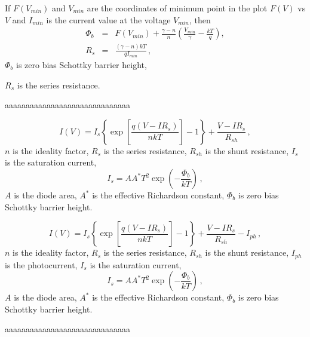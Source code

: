 \documentclass[14pt]{article}
\numberwithin{equation}{part}
\begin{document}
If $F(V_{min})$ and $V_{min}$ are the coordinates of minimum point in the plot $F(V)$ vs $V$ and
$I_{min}$ is the current value at the voltage $V_{min}$, then
\begin{eqnarray*}
\Phi_b&=&F(V_{min})+\frac{\gamma-n}{n}\left(\frac{V_{min}}{\gamma}-\frac{kT}{q}\right),
\\
R_s&=&\frac{(\gamma-n)kT}{qI_{min}}\,,
\end{eqnarray*}
$\Phi_b$ is zero bias Schottky barrier height,

\noindent
$R_s$ is the series resistance.


\vspace{5mm}
aaaaaaaaaaaaaaaaaaaaaaaaaaaaaa
\vspace{5mm}

\begin{equation*}
I(V)=I_s\left\{\exp \left[\frac{q(V-IR_s)}{nkT}\right]-1\right\}+\frac{V-IR_s}{R_{sh}}\,,
\end{equation*}
$n$ is the ideality factor,
$R_s$ is the series resistance,
$R_{sh}$ is the shunt resistance,
$I_s$ is the saturation current,
\begin{equation*}
I_s=AA^*T^2\exp\left(-\frac{\Phi_b}{kT}\right)\,,
\end{equation*}
$A$ is the diode area,
$A^*$ is the effective Richardson constant,
$\Phi_b$ is zero bias Schottky barrier height.



\pagebreak

\begin{equation*}
I(V)=I_s\left\{\exp \left[\frac{q(V-IR_s)}{nkT}\right]-1\right\}+\frac{V-IR_s}{R_{sh}}-I_{ph}\,,
\end{equation*}
$n$ is the ideality factor,
$R_s$ is the series resistance,
$R_{sh}$ is the shunt resistance,
$I_{ph}$ is the photocurrent,
$I_s$ is the saturation current,
\begin{equation*}
I_s=AA^*T^2\exp\left(-\frac{\Phi_b}{kT}\right)\,,
\end{equation*}
$A$ is the diode area,
$A^*$ is the effective Richardson constant,
$\Phi_b$ is zero bias Schottky barrier height.

\vspace{5mm}
aaaaaaaaaaaaaaaaaaaaaaaaaaaaaa
\vspace{5mm}
\end{document}
